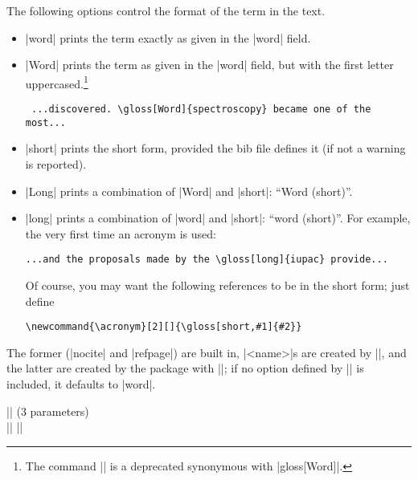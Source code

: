 \documentclass{ltxguide}
\newcommand{\gloss}{\textsf{gloss}}
\begin{document}
The following options control the format of the term in the text.

\begin{itemize}

\item |word| prints the term exactly as given in the |word| field.

\item |Word| prints the term as given in the |word| field, but 
  with the first letter uppercased.\footnote{%
  The command |\string\Gloss| is a deprecated synonymous with
  |\string\gloss[Word]|.}

\begin{verbatim}
 ...discovered. \gloss[Word]{spectroscopy} became one of the most...
\end{verbatim}

\item |short| prints the short form, provided the bib file defines it
  (if not a warning is reported).

\item |Long| prints a combination of |Word| and |short|: ``Word 
  (short)''.

\item |long| prints a combination of |word| and |short|: ``word 
(short)''.  For example, the very first time an acronym is used:
\begin{verbatim}
...and the proposals made by the \gloss[long]{iupac} provide...
\end{verbatim}
  Of course, you may want the following references to be in the short
  form; just define
\begin{verbatim}
\newcommand{\acronym}[2][]{\gloss[short,#1]{#2}}
\end{verbatim}

\end{itemize} The former (|nocite| and |refpage|) are built in, 
|<name>|s are created by |\newgloss|, and the latter are created by 
the package with |\setglosstext|; if no option defined by 
|\setglosstext| is included, it defaults to |word|.

\begin{decl}
|| \quad (3 parameters)\\
|| \qquad ||
\end{decl}
\end{document}
